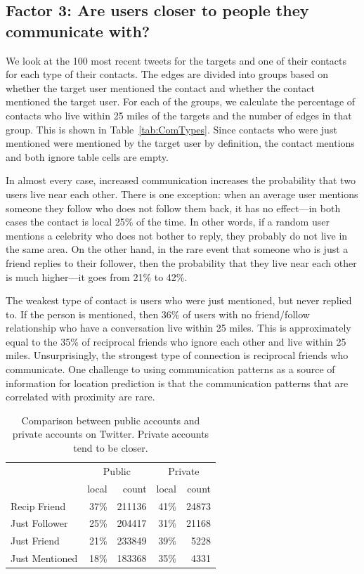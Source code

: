 \documentclass[letterpaper]{article}
\begin{document}
\subsection{Factor 3: Are users closer to people they communicate with?}

We look at the 100 most recent tweets for the targets and one of their
contacts for each type of their contacts.
%
The edges are divided into groups based on whether the target user
mentioned the contact and whether the contact mentioned the target user.
%
For each of the groups, we calculate the percentage of contacts who
live within 25 miles of the targets and the number of edges in that group.
%
This is shown in Table~\ref{tab:ComTypes}.
%
Since contacts who were just mentioned were mentioned by the target
user by definition, the contact mentions and both ignore table cells are
empty.

In almost every case, increased communication increases the probability that
two users live near each other.
%
There is one exception: when an average user mentions someone they follow who
does not follow them back, it has no effect---in both cases the contact is
local 25\% of the time.
%
In other words, if a random user mentions a celebrity who does not bother to
reply, they probably do not live in the same area.
%
On the other hand, in the rare event that someone who is just a friend replies
to their follower, then the probability that they live near each other is much
higher---it goes from 21\% to 42\%.

The weakest type of contact is users who were just mentioned, but never
replied to.
%
If the person is mentioned, then 36\% of users with no
friend/follow relationship who have a conversation live within 25 miles.
%
This is approximately equal to the 35\% of reciprocal friends who ignore each
other and live within 25 miles.
%
Unsurprisingly, the strongest type of connection is reciprocal friends who
communicate.
%
One challenge to using communication patterns as a source of information for
location prediction is that the communication patterns that are correlated
with proximity are rare.

\begin{table}[tbh]
\centering
\begin{tabular}{l | r r | r r}
    & \multicolumn{2}{c}{Public}
    & \multicolumn{2}{|c}{Private} \\
    \cline{2-5}
    &local&count&local&count \\
    \hline
    Recip Friend & 37\%&211136 & 41\%&24873 \\
    Just Follower & 25\%&204417 & 31\%&21168 \\
    Just Friend & 21\%&233849 & 39\%&5228 \\
    Just Mentioned & 18\%&183368 & 35\%&4331 \\
\end{tabular}
\caption{
    Comparison between public accounts and private accounts on Twitter.
    Private accounts tend to be closer.
}
\label{tab:EdgeTypesProt}
\end{table}
\end{document}
